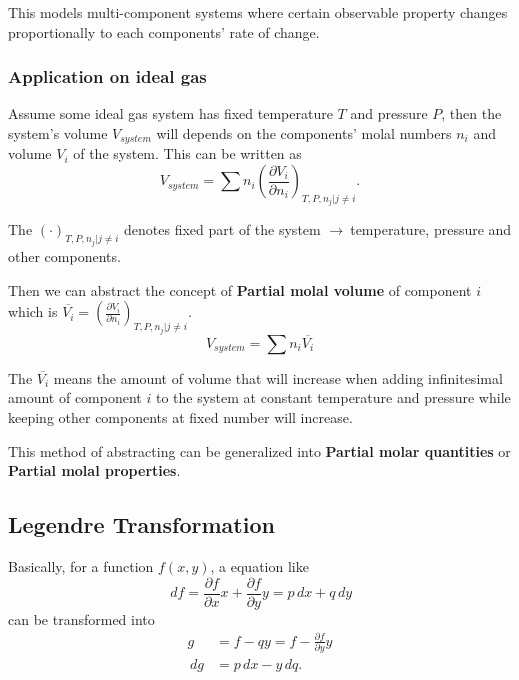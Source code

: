 \documentclass[11pt,a4paper,fleqn]{article}
\newcommand{\go}{$ \rightarrow\ $}
\newcommand{\Concept}{\textbf}
\newcommand{\D}{\ensuremath{\,d}}
\begin{document}
This models multi-component systems where certain observable property changes proportionally to each components' rate of change.

\subsubsection{Application on ideal gas}
Assume some ideal gas system has fixed temperature $T$ and pressure $P$, then the system's volume $V_{system}$ will depends on the components' molal numbers $n_i$ and volume $V_i$ of the system. This can be written as
\begin{equation}
  V_{system} = \sum n_i \left( \frac{\partial V_i}{\partial n_i} \right)_{T,P,{n_j|j\neq i}}.
\end{equation}

The $\left( \cdotp \right)_{T,P,{n_j|j\neq i}}$ denotes fixed part of the system \go temperature, pressure and other components.

Then we can abstract the concept of \Concept{Partial molal volume} of component $i$ which is $\overline{V_i} = \left( \frac{\partial V_i}{\partial n_i} \right)_{T,P,{n_j|j\neq i}}$.
\begin{equation}
  V_{system} =\sum n_i \overline{V_i}
\end{equation}

The $\overline{V_i}$ means the amount of volume that will increase when adding infinitesimal amount of component $i$ to the system at constant temperature and pressure while keeping other components at fixed number will increase.

This method of abstracting can be generalized into \Concept{Partial molar quantities} or \Concept{Partial molal properties}.

\subsection{Legendre Transformation}

Basically, for a function $f(x,y)$, a equation like
\begin{equation}
  \D f = \frac{\partial f}{\partial x} x + \frac{\partial f}{\partial y} y= p \D x + q \D y
\end{equation} can be transformed into
\begin{align}
  g &= f - qy = f - \frac{\partial f}{\partial y}y\\
 \D g &= p \D x - y \D q.
\end{align}
\end{document}
